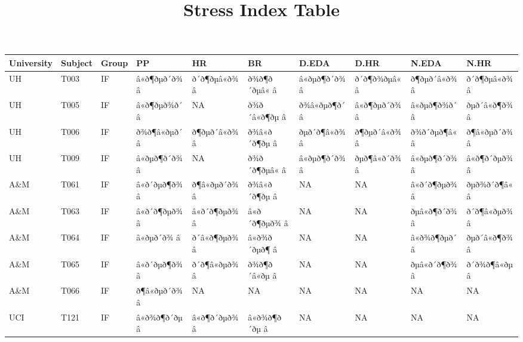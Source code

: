 \documentclass[]{article}
\title{Stress Index Table}
\author{}
\date{}
\begin{document}
\maketitle

\begin{table}[H]
\centering\begingroup\fontsize{10.21}{12.21}\selectfont

\begin{tabular}{l|l|l|l|l|l|l|l|l|l}
\hline
University & Subject & Group & PP & HR & BR & D.EDA & D.HR & N.EDA & N.HR\\
\hline
UH & T003 & IF & â«ð¶ðµð´ð¾ â & ð´ð¶ðµâ«ð¾ â & ð¾ð¶ð´ðµâ« â & â«ðµð¶ð´ð¾ â & ð´ð¶ð¾ðµâ« â & ð¶ðµð´â«ð¾ â & ð´ð¶ðµâ«ð¾ â\\
\hline
UH & T005 & IF & â«ð¶ðµð¾ð´ â & NA & ð¾ð´â«ð¶ðµ â & ð¾â«ðµð¶ð´ â & â«ð¶ðµð´ð¾ â & â«ðµð¶ð¾ð´ â & ðµð´â«ð¶ð¾ â\\
\hline
UH & T006 & IF & ð¾ð¶â«ðµð´ â & ð¶ðµð´â«ð¾ â & ð¾â«ð´ð¶ðµ â & ðµð´ð¶â«ð¾ â & ð¶ðµð´â«ð¾ â & ð¾ð´ðµð¶â« â & ð¶â«ðµð´ð¾ â\\
\hline
UH & T009 & IF & â«ðµð¶ð´ð¾ â & NA & ð¾ð´ð¶ðµâ« â & â«ðµð¶ð´ð¾ â & ðµð¶â«ð´ð¾ â & â«ðµð¶ð´ð¾ â & â«ð¶ð´ðµð¾ â\\
\hline
A\&M & T061 & IF & â«ð´ðµð¶ð¾ â & ð¶â«ðµð´ð¾ â & ð¾â«ð´ð¶ðµ â & NA & NA & â«ð´ð¶ðµð¾ â & ðµð¾ð´ð¶â« â\\
\hline
A\&M & T063 & IF & â«ð´ð¶ðµð¾ â & â«ð´ð¶ðµð¾ â & â«ð´ð¶ðµð¾ â & NA & NA & ðµâ«ð¶ð´ð¾ â & ð´ð¶â«ðµð¾ â\\
\hline
A\&M & T064 & IF & â«ðµð´ð¾ â & ð´â«ð¶ðµð¾ â & â«ð¾ð´ðµð¶ â & NA & NA & â«ð¾ð¶ðµð´ â & ðµð´â«ð¶ð¾ â\\
\hline
A\&M & T065 & IF & â«ð´ðµð¶ð¾ â & ð´ð¶â«ðµð¾ â & ð¾ð¶ð´â«ðµ â & NA & NA & ðµâ«ð´ð¶ð¾ â & ð´ð¾ð¶â«ðµ â\\
\hline
A\&M & T066 & IF & ð¶â«ðµð´ð¾ â & NA & NA & NA & NA & NA & NA\\
\hline
UCI & T121 & IF & â«ð¾ð¶ð´ðµ â & â«ð¶ð´ðµð¾ â & â«ð¾ð¶ð´ðµ â & NA & NA & NA & NA\\

\end{tabular}
\end{table}
\end{document}
